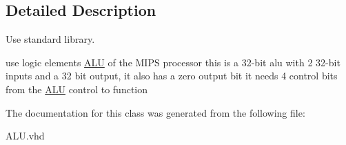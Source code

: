 \subsection{\-Detailed \-Description}
\-Use standard library. 

use logic elements \hyperlink{class_a_l_u}{\-A\-L\-U} of the \-M\-I\-P\-S processor this is a 32-\/bit alu with 2 32-\/bit inputs and a 32 bit output, it also has a zero output bit it needs 4 control bits from the \hyperlink{class_a_l_u}{\-A\-L\-U} control to function 

\-The documentation for this class was generated from the following file\-:\begin{DoxyCompactItemize}
\item 
\-A\-L\-U.\-vhd\end{DoxyCompactItemize}
